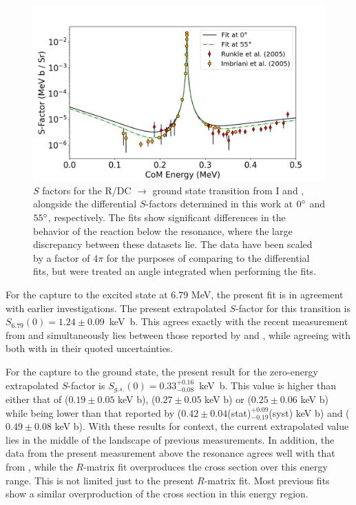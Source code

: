 \begin{figure}
\centering
\includegraphics[width=1.0\columnwidth]{./figures/compare_runkle_imbriani.png}
\caption{$S$ factors for the R/DC $\rightarrow$ ground state transition from I\citet{Runkle2005} and \citet{Imbriani2005}, alongside the differential $S$-factors determined in this work at $0\degree$ and $55\degree$, respectively. The fits show significant differences in the behavior of the reaction below the resonance, where the large discrepancy between these datasets lie. The data have been scaled by a factor of $4\pi$ for the purposes of comparing to the differential fits, but were treated an angle integrated when performing the fits. }
\label{fig: sfactor_runkle_imbriani}
\end{figure}


For the capture to the excited state at 6.79 MeV, the present fit is in agreement with earlier investigations. The present extrapolated $S$-factor for this transition is $S_{6.79}(0) = 1.24 \pm 0.09$~keV~b. This agrees exactly with the recent measurement from \citet{Wagner2018} and simultaneously lies between those reported by \citet{Adelberger2011} and \citet{Li2016}, while agreeing with both with in their quoted uncertainties. 

For the capture to the ground state, the present result for the zero-energy extrapolated $S$-factor is $S_{g.s.}(0) = 0.33_{-0.08}^{+0.16} $~keV~b. This value is higher than either that of \citet{Wagner2018} ($0.19 \pm 0.05$ keV b), \citet{Adelberger2011} ($0.27 \pm 0.05$ keV b) or \citet{Imbriani2005} ($0.25 \pm 0.06$ keV b) while being lower than that reported by \citet{Li2016} ($0.42 \pm 0.04$(stat)$^{+0.09}_{-0.19}$(syst) keV b) and \citet{Runkle2005} ($0.49 \pm 0.08$ keV b). With these results for context, the current extrapolated value lies in the middle of the landscape of previous measurements. In addition, the data from the present measurement above the resonance agrees well with that from \citet{Runkle2005}, while the $R$-matrix fit overproduces the cross section over this energy range. This is not limited just to the present $R$-matrix fit. Most previous fits~\cite{PhysRevC.67.065804, Imbriani2005, Azuma2010, Adelberger2011, Li2016, Wagner2018} show a similar overproduction of the cross section in this energy region. 

